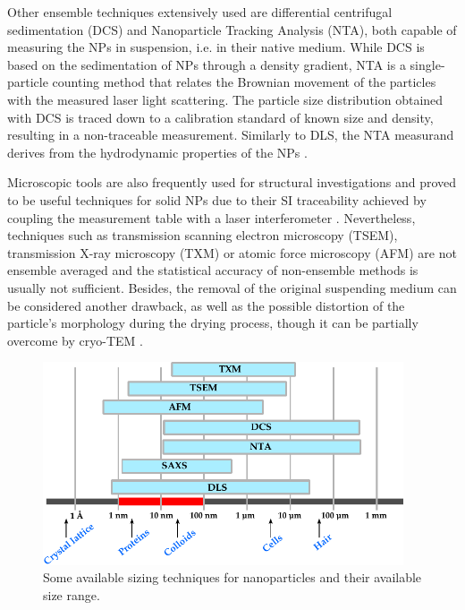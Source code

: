 Other ensemble techniques extensively used are differential centrifugal sedimentation (DCS) \citep{fielding_correcting_2012} and Nanoparticle Tracking Analysis (NTA), both capable of measuring the NPs in suspension, i.e. in their native medium. While DCS is based on the sedimentation of NPs through a density gradient, NTA is a single-particle counting method that relates the Brownian movement of the particles with the measured laser light scattering. The particle size distribution obtained with DCS is traced down to a calibration standard of known size and density, resulting in a non-traceable measurement. Similarly to DLS, the NTA measurand derives from the hydrodynamic properties of the NPs \citep{varga_towards_2014}.

Microscopic tools are also frequently used for structural investigations \citep{joensson_morphology_1991,silverstein_microstructure_1989} and proved to be useful techniques for solid NPs due to their SI traceability achieved by coupling the measurement table with a laser interferometer \citep{meli_traceable_2012}. Nevertheless, techniques such as transmission scanning electron microscopy (TSEM), transmission X-ray microscopy (TXM) or atomic force microscopy (AFM) are not ensemble averaged and the statistical accuracy of non-ensemble methods is usually not sufficient. Besides, the removal of the original suspending medium can be considered another drawback, as well as the possible distortion of the particle's morphology during the drying process, though it can be partially overcome by cryo-TEM \citep{li_doxorubicin_1998}.

\begin{figure}[hbt]%
	\centering
		\includegraphics[width=0.95\textwidth]{Figures/SizeRange.pdf}
		\caption[Sizing techniques]{Some available sizing techniques for nanoparticles and their available size range.}
		\label{fig:SizeRange}
\end{figure}

